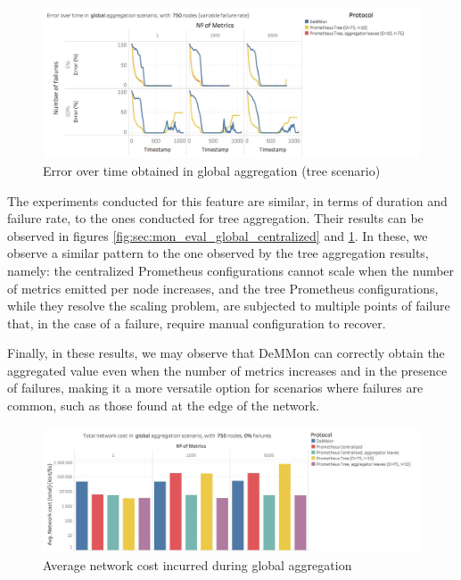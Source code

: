 \begin{figure}
    \centering
    \includegraphics[width=\linewidth]{Chapters/evaluation/figures/aggregation/Error_over_time_global_tree.jpg}
    \caption{Error over time obtained in global aggregation (tree scenario)}
    \label{fig:sec:mon_eval_global_tree}
\end{figure}

The experiments conducted for this feature are similar, in terms of duration and failure rate, to the ones conducted for tree aggregation. Their results can be observed in figures \ref{fig:sec:mon_eval_global_centralized} and \ref{fig:sec:mon_eval_global_tree}. In these, we observe a similar pattern to the one observed by the tree aggregation results, namely: the centralized Prometheus configurations cannot scale when the number of metrics emitted per node increases, and the tree Prometheus configurations, while they resolve the scaling problem, are subjected to multiple points of failure that, in the case of a failure, require manual configuration to recover. 

Finally, in these results, we may observe that DeMMon can correctly obtain the aggregated value even when the number of metrics increases and in the presence of failures, making it a more versatile option for scenarios where failures are common, such as those found at the edge of the network.

\begin{figure}
    \centering
    \includegraphics[width=\linewidth]{Chapters/evaluation/figures/aggregation/network_cost_global.jpg}
    \caption{Average network cost incurred during global aggregation}
    \label{fig:sec:mon_eval_global_net_cost}
\end{figure}

